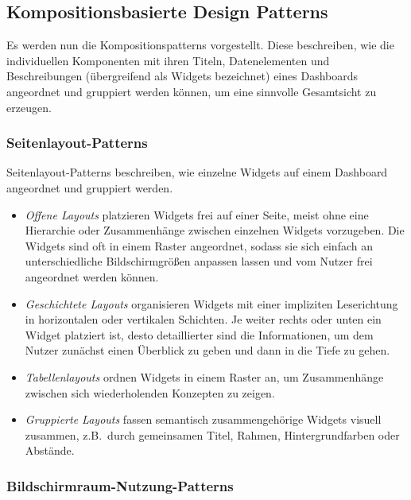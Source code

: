 
\subsection{Kompositionsbasierte Design Patterns}\label{subsec:conposition-design-patterns}

Es werden nun die Kompositionspatterns vorgestellt.
Diese beschreiben, wie die individuellen Komponenten mit ihren Titeln, Datenelementen und Beschreibungen (übergreifend als Widgets bezeichnet) eines Dashboards angeordnet und gruppiert werden können, um eine sinnvolle Gesamtsicht zu erzeugen.

\subsubsection{Seitenlayout-Patterns}

\autocite[S. 4]{Bach.DashboardDesignPatterns.2023} Seitenlayout-Patterns beschreiben, wie einzelne Widgets auf einem Dashboard angeordnet und gruppiert werden.

\begin{itemize}
    \item \emph{Offene Layouts} platzieren Widgets frei auf einer Seite, meist ohne eine Hierarchie oder Zusammenhänge zwischen einzelnen Widgets vorzugeben.
    Die Widgets sind oft in einem Raster angeordnet, sodass sie sich einfach an unterschiedliche Bildschirmgrößen anpassen lassen und vom Nutzer frei angeordnet werden können.
    \item \emph{Geschichtete Layouts} organisieren Widgets mit einer impliziten Leserichtung in horizontalen oder vertikalen Schichten.
    Je weiter rechts oder unten ein Widget platziert ist, desto detaillierter sind die Informationen, um dem Nutzer zunächst einen Überblick zu geben und dann in die Tiefe zu gehen.
    \item \emph{Tabellenlayouts} ordnen Widgets in einem Raster an, um Zusammenhänge zwischen sich wiederholenden Konzepten zu zeigen.
    \item \emph{Gruppierte Layouts} fassen semantisch zusammengehörige Widgets visuell zusammen, z.B.\ durch gemeinsamen Titel, Rahmen, Hintergrundfarben oder Abstände.
\end{itemize}

\subsubsection{Bildschirmraum-Nutzung-Patterns}

